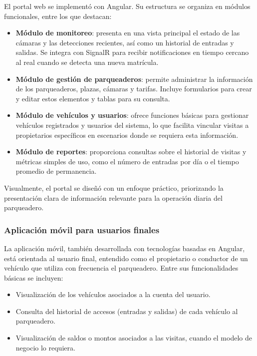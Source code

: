 El portal web se implementó con Angular. Su estructura se organiza en módulos funcionales, entre los que destacan:

\begin{itemize}
    \item \textbf{Módulo de monitoreo}: presenta en una vista principal el estado de las cámaras y las detecciones recientes, así como un historial de entradas y salidas. Se integra con SignalR para recibir notificaciones en tiempo cercano al real cuando se detecta una nueva matrícula.
    \item \textbf{Módulo de gestión de parqueaderos}: permite administrar la información de los parqueaderos, plazas, cámaras y tarifas. Incluye formularios para crear y editar estos elementos y tablas para su consulta.
    \item \textbf{Módulo de vehículos y usuarios}: ofrece funciones básicas para gestionar vehículos registrados y usuarios del sistema, lo que facilita vincular visitas a propietarios específicos en escenarios donde se requiera esta información.
    \item \textbf{Módulo de reportes}: proporciona consultas sobre el historial de visitas y métricas simples de uso, como el número de entradas por día o el tiempo promedio de permanencia.
\end{itemize}

Visualmente, el portal se diseñó con un enfoque práctico, priorizando la presentación clara de información relevante para la operación diaria del parqueadero.

\subsubsection{Aplicación móvil para usuarios finales}

La aplicación móvil, también desarrollada con tecnologías basadas en Angular, está orientada al usuario final, entendido como el propietario o conductor de un vehículo que utiliza con frecuencia el parqueadero. Entre sus funcionalidades básicas se incluyen:

\begin{itemize}
    \item Visualización de los vehículos asociados a la cuenta del usuario.
    \item Consulta del historial de accesos (entradas y salidas) de cada vehículo al parqueadero.
    \item Visualización de saldos o montos asociados a las visitas, cuando el modelo de negocio lo requiera.
\end{itemize}

